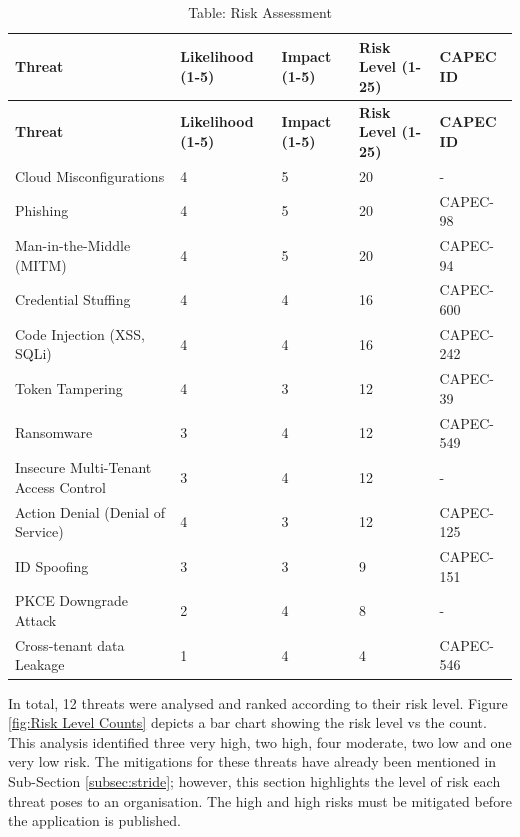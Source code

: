 \begin{longtable}{|p{4cm}|p{2cm}|p{2cm}|p{2cm}|p{3cm}|}
\caption{Table: Risk Assessment}
\label{table:risk_assessment}
\hline
\rowcolor{grey!15}
\textbf{Threat} & \textbf{Likelihood (1-5)} & \textbf{Impact (1-5)} & \textbf{Risk Level (1-25)} & \textbf{CAPEC ID}\\
\hline
\endfirsthead

\hline
\rowcolor{grey!15}
\textbf{Threat} & \textbf{Likelihood (1-5)} & \textbf{Impact (1-5)} & \textbf{Risk Level (1-25)} & \textbf{CAPEC ID}\\
\hline
\endhead

\hline
\endfoot

\hline
\endlastfoot
Cloud Misconfigurations & 4 & 5 & \cellcolor{red!90} 20 & - \\
\hline
Phishing & 4 & 5 & \cellcolor{red!90} 20 & CAPEC-98  \\
\hline
Man-in-the-Middle (MITM) & 4 & 5 & \cellcolor{red!90} 20 &  CAPEC-94\\
\hline
Credential Stuffing & 4 & 4 & \cellcolor{red!60} 16 & CAPEC-600 \\
\hline
Code Injection (XSS, SQLi) & 4 & 4 & \cellcolor{red!60} 16 & CAPEC-242 \\
\hline
Token Tampering & 4 & 3 &  \cellcolor{yellow!90} 12 &CAPEC-39 \\
\hline
Ransomware & 3 & 4 &  \cellcolor{yellow!90} 12 & CAPEC-549 \\
\hline
Insecure Multi-Tenant Access Control & 3 & 4 &  \cellcolor{yellow!90} 12 & - \\
\hline
Action Denial (Denial of Service) & 4 & 3 &  \cellcolor{yellow!90} 12 & CAPEC-125\\
\hline
ID Spoofing & 3 & 3 &  \cellcolor{green!20} 9 & CAPEC-151\\
\hline

PKCE Downgrade Attack & 2 & 4 & \cellcolor{green!20} 8 & -\\
\hline
Cross-tenant data Leakage & 1 & 4 &  \cellcolor{ForestGreen} 4 & CAPEC-546 \\
\hline

\end{longtable}
 In total, 12 threats were analysed and ranked according to their risk level. Figure \ref{fig:Risk Level Counts} depicts a bar chart showing the risk level vs the count. This analysis identified three very high, two high, four moderate, two low and one very low risk. The mitigations for these threats have already been mentioned in Sub-Section \ref{subsec:stride}; however, this section highlights the level of risk each threat poses to an organisation. The high and high risks must be mitigated before the application is published. 

